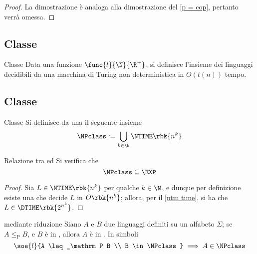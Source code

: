 \documentclass[a4paper, 12pt]{report}
\begin{document}
    \begin{proof}
        La dimostrazione è analoga alla dimostrazione del \cref{p = cop}, pertanto verrà omessa.
    \end{proof}

    \subsection{Classe \NTIME}

    \begin{frameddefn}{Classe \NTIME}
        Data una funzione $\func{t}{\N}{\R^+}$, si definisce  l'insieme dei linguaggi decidibili da una macchina di Turing non deterministica in $O(t(n))$ tempo.
    \end{frameddefn}

    \subsection{Classe \NPclass}
    
    \begin{frameddefn}[label={np def}]{Classe \NPclass}
        Si definisce  da una \NTM il seguente insieme $$\NPclass := \bigcup_{k \in \N}{\NTIME \rbk{n^k}}$$
    \end{frameddefn}

    \begin{framedprop}[label={np exp}]{Relazione tra \NPclass ed \EXP}
        Si verifica che $$\NPclass \subseteq \EXP$$
    \end{framedprop}

    \begin{proof}
        Sia $L \in \NTIME\rbk{n^k}$ per qualche $k \in \N$, e dunque per definizione esiste una \NTM che decide $L$ in $O\rbk{n^k}$; allora, per il \cref{ntm time}, si ha che $L \in \DTIME \rbk{2^{n^k}}$.
    \end{proof}

    \begin{framedthm}[label={np w red}]{\NPclass mediante riduzione}
        Siano $A$ e $B$ due linguaggi definiti su un alfabeto $\Sigma$; se $A \leq_\mathrm P B$, e $B$ è in \NPclass, allora $A$ è in \NPclass. In simboli $$\soe{l}{A \leq_\mathrm P B \\ B \in \NPclass} \implies A \in \NPclass$$
    \end{framedthm}
\end{document}
